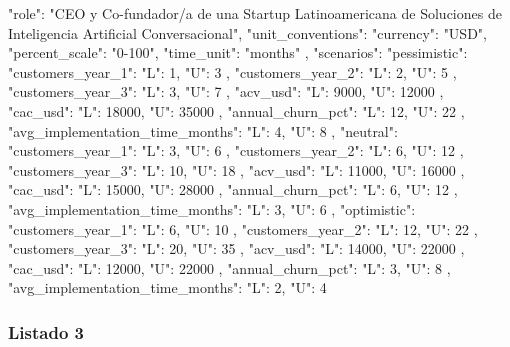 \begin{APACode}
{
  "role": "CEO y Co-fundador/a de una Startup Latinoamericana de Soluciones de Inteligencia Artificial Conversacional",
  "unit_conventions": {
    "currency": "USD",
    "percent_scale": "0-100",
    "time_unit": "months"
  },
  "scenarios": {
    "pessimistic": {
      "customers_year_1": {
        "L": 1,
        "U": 3
      },
      "customers_year_2": {
        "L": 2,
        "U": 5
      },
      "customers_year_3": {
        "L": 3,
        "U": 7
      },
      "acv_usd": {
        "L": 9000,
        "U": 12000
      },
      "cac_usd": {
        "L": 18000,
        "U": 35000
      },
      "annual_churn_pct": {
        "L": 12,
        "U": 22
      },
      "avg_implementation_time_months": {
        "L": 4,
        "U": 8
      }
    },
    "neutral": {
      "customers_year_1": {
        "L": 3,
        "U": 6
      },
      "customers_year_2": {
        "L": 6,
        "U": 12
      },
      "customers_year_3": {
        "L": 10,
        "U": 18
      },
      "acv_usd": {
        "L": 11000,
        "U": 16000
      },
      "cac_usd": {
        "L": 15000,
        "U": 28000
      },
      "annual_churn_pct": {
        "L": 6,
        "U": 12
      },
      "avg_implementation_time_months": {
        "L": 3,
        "U": 6
      }
    },
    "optimistic": {
      "customers_year_1": {
        "L": 6,
        "U": 10
      },
      "customers_year_2": {
        "L": 12,
        "U": 22
      },
      "customers_year_3": {
        "L": 20,
        "U": 35
      },
      "acv_usd": {
        "L": 14000,
        "U": 22000
      },
      "cac_usd": {
        "L": 12000,
        "U": 22000
      },
      "annual_churn_pct": {
        "L": 3,
        "U": 8
      },
      "avg_implementation_time_months": {
        "L": 2,
        "U": 4
      }
    }
  }
}
\end{APACode}

\subsubsection{Listado 3}
\label{anexo:code-6-3-2-3}

